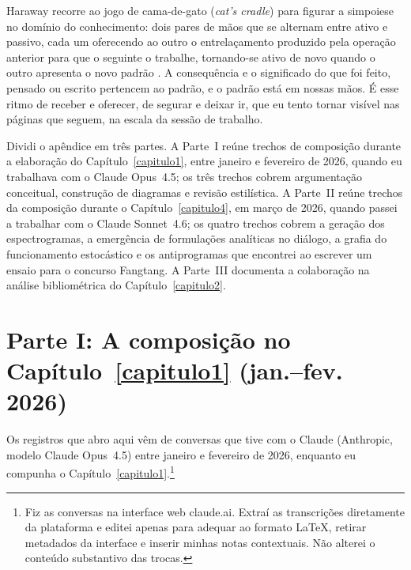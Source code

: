Haraway recorre ao jogo de cama-de-gato (\textit{cat's cradle}) para figurar a simpoiese no domínio do conhecimento: dois pares de mãos que se alternam entre ativo e passivo, cada um oferecendo ao outro o entrelaçamento produzido pela operação anterior para que o seguinte o trabalhe, tornando-se ativo de novo quando o outro apresenta o novo padrão \parencite{Haraway2016Staying}. A consequência e o significado do que foi feito, pensado ou escrito pertencem ao padrão, e o padrão está em nossas mãos. É esse ritmo de receber e oferecer, de segurar e deixar ir, que eu tento tornar visível nas páginas que seguem, na escala da sessão de trabalho.

Dividi o apêndice em três partes. A Parte~I reúne trechos de composição durante a elaboração do Capítulo~\ref{capitulo1}, entre janeiro e fevereiro de 2026, quando eu trabalhava com o Claude Opus~4.5; os três trechos cobrem argumentação conceitual, construção de diagramas e revisão estilística. A Parte~II reúne trechos da composição durante o Capítulo~\ref{capitulo4}, em março de 2026, quando passei a trabalhar com o Claude Sonnet~4.6; os quatro trechos cobrem a geração dos espectrogramas, a emergência de formulações analíticas no diálogo, a grafia do funcionamento estocástico e os antiprogramas que encontrei ao escrever um ensaio para o concurso Fangtang. A Parte~III documenta a colaboração na análise bibliométrica do Capítulo~\ref{capitulo2}.


\part*{Parte I: A composição no Capítulo~\ref{capitulo1} (jan.--fev. 2026)}

Os registros que abro aqui vêm de conversas que tive com o Claude (Anthropic, modelo Claude Opus~4.5) entre janeiro e fevereiro de 2026, enquanto eu compunha o Capítulo~\ref{capitulo1}.\footnote{Fiz as conversas na interface web claude.ai. Extraí as transcrições diretamente da plataforma e editei apenas para adequar ao formato \LaTeX{}, retirar metadados da interface e inserir minhas notas contextuais. Não alterei o conteúdo substantivo das trocas.}


